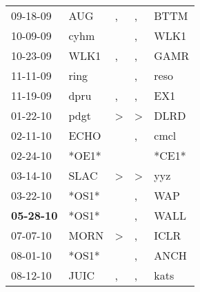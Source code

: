 \begin{supertabular}{p{0.07\textwidth}p{0.06\textwidth}p{0.02\textwidth}p{0.02\textwidth}p{0.06\textwidth}}
          09-18-09\textsuperscript{} &            AUG\textsuperscript{} &                , &                , &           BTTM\textsuperscript{} \\
          10-09-09\textsuperscript{} &           cyhm\textsuperscript{} &                  &                , &           WLK1\textsuperscript{} \\
          10-23-09\textsuperscript{} &           WLK1\textsuperscript{} &                , &                , &           GAMR\textsuperscript{} \\
          11-11-09\textsuperscript{} &           ring\textsuperscript{} &                  &                , &           reso\textsuperscript{} \\
          11-19-09\textsuperscript{} &           dpru\textsuperscript{} &                , &                , &            EX1\textsuperscript{} \\
          01-22-10\textsuperscript{} &           pdgt\textsuperscript{} &     \textgreater &     \textgreater &           DLRD\textsuperscript{} \\
          02-11-10\textsuperscript{} &           ECHO\textsuperscript{} &                  &                , &           cmcl\textsuperscript{} \\
          02-24-10\textsuperscript{} &                            *OE1* &                  &                  &                            *CE1* \\
          03-14-10\textsuperscript{} &           SLAC\textsuperscript{} &     \textgreater &     \textgreater &            yyz\textsuperscript{} \\
          03-22-10\textsuperscript{} &                            *OS1* &                  &                , &            WAP\textsuperscript{} \\
 \textbf{05-28-10\textsuperscript{}} &                            *OS1* &                  &                , &           WALL\textsuperscript{} \\
          07-07-10\textsuperscript{} &           MORN\textsuperscript{} &     \textgreater &                , &           ICLR\textsuperscript{} \\
          08-01-10\textsuperscript{} &                            *OS1* &                  &                , &           ANCH\textsuperscript{} \\
          08-12-10\textsuperscript{} &           JUIC\textsuperscript{} &                , &                , &           kats\textsuperscript{} \\

\end{supertabular}
